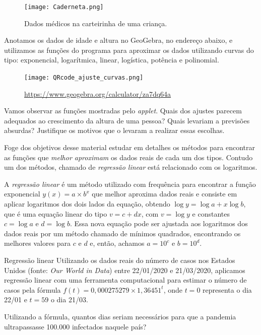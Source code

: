 \begin{figure}[H]
\centering

\texttt{[image: Caderneta.png]}
\caption{Dados médicos na carteirinha de uma criança.}
\end{figure}

Anotamos os dados de idade e altura no GeoGebra, no endereço abaixo, e utilizamos as funções do programa para aproximar os dados utilizando curvas do tipo: exponencial, logarítmica, linear, logística, potência e polinomial.

\begin{figure}[H]
\centering

\texttt{[image: QRcode\_ajuste\_curvas.png]}

\url{https://www.geogebra.org/calculator/za7dq64a}
\end{figure}

\begin{reflection}
Vamos observar as funções mostradas pelo \textit{applet}. Quais dos ajustes parecem adequados ao crescimento da altura de uma pessoa? Quais levariam a previsões absurdas? Justifique os motivos que o levaram a realizar essas escolhas.
\end{reflection}


Foge dos objetivos desse material estudar em detalhes os métodos para encontrar as funções que \textit{melhor aproximam} os dados reais de cada um dos tipos. Contudo um dos métodos, chamado de \textit{regressão linear} está relacionado com os logaritmos.

\begin{knowledge}
A \textit{regressão linear} é um método utilizado com frequência para encontrar a função exponencial $y(x) =a \times b^x$ que melhor aproxima dados reais e consiste em aplicar logaritmos dos dois lados da equação, obtendo $\log y = \log a + x \log b$, que é uma equação linear do tipo $v = c + dx$, com $v = \log y$ e constantes $c=\log a$ e $d=\log b$. Essa nova equação pode ser ajustada aos logaritmos dos dados reais por um método chamado de mínimos quadrados, encontrando os melhores valores para $c$ e $d$ e, então, achamos $a= 10^c$ e $b=10^d$.
\end{knowledge}


\begin{task}{Regressão linear}
Utilizando os dados reais do número de casos nos Estados Unidos (fonte: \textit{Our World in Data}) entre 22/01/2020 e 21/03/2020, aplicamos regressão linear com uma ferramenta computacional para estimar o número de casos pela fórmula $f(t) = 0{,}000275279 \times 1{,}36451^t$, onde $t=0$ representa o dia 22/01 e $t= 59$ o dia 21/03. %

Utilizando a fórmula, quantos dias seriam necessários para que a pandemia ultrapassasse 100.000 infectados naquele país?
\end{task}

